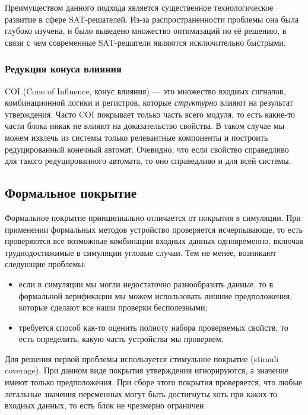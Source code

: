 Преимуществом данного подхода является существенное технологическое развитие в сфере SAT-решателей. Из-за распространённости проблемы она была глубоко изучена, и было выведено множество оптимизаций по её решению, в связи с чем современные SAT-решатели являются исключительно быстрыми. 

\subsubsection{Редукция конуса влияния}

\tab COI (Cone of Influence, конус влияния)\cite{formal_verif} --- это множество входных сигналов, комбинационной логики и регистров, которые \textit{структурно} влияют на результат утверждения. Часто COI покрывает только часть всего модуля, то есть какие-то части блока никак не влияют на доказательство свойства. В таком случае мы можем извлечь из системы только релевантные компоненты и построить редуцированный конечный автомат. Очевидно, что если свойство справедливо для такого редуцированного автомата, то оно справедливо и для всей системы. 

\subsection{Формальное покрытие}

\tab Формальное покрытие\cite{formal_coverage} принципиально отличается от покрытия в симуляции. При применении формальных методов устройство проверяется исчерпывающе, то есть проверяются все возможные комбинации входных данных одновременно, включая труднодостижимые в симуляции угловые случаи. Тем не менее, возникают следующие проблемы: 

\begin{itemize}
	\item если в симуляции мы могли недостаточно разнообразить данные, то в формальной верификации мы можем использовать лишние предположения, которые сделают все наши проверки бесполезными;
	\item требуется способ как-то оценить полноту набора проверяемых свойств, то есть определить, какую часть устройства мы проверяем. 
\end{itemize}

Для решения первой проблемы используется стимульное покрытие (stimuli coverage). При данном виде покрытия утверждения игнорируются, а значение имеют только предположения. При сборе этого покрытия проверяется, что любые легальные значения переменных могут быть достигнуты хоть при каких-то входных данных, то есть блок не чрезмерно ограничен.

